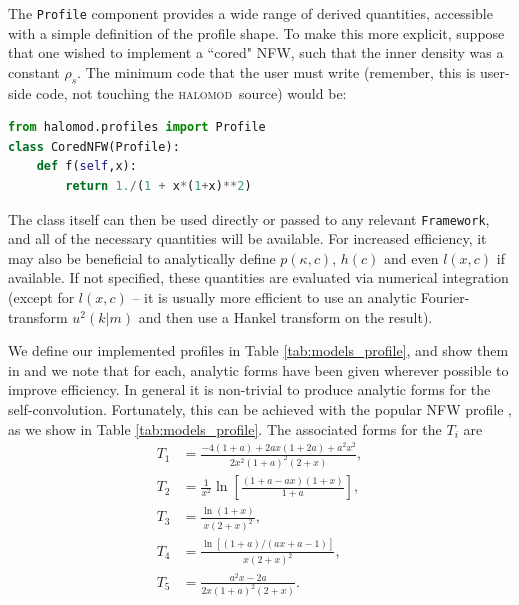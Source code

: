 \documentclass[5p,aas_macros]{elsarticle}
\newcommand{\halomod}{\textsc{halomod}\xspace} %
\newcommand{\framework}{\texttt{Framework}\xspace} %
\begin{document}
The \verb|Profile| component provides a wide range of derived quantities, accessible with a simple definition of the profile shape. To make this more explicit, suppose that one wished to implement a ``cored" NFW, such that the inner density was a constant $\rho_s$. The minimum code that the user must write (remember, this is user-side code, not touching the \halomod\ source) would be:
\begin{lstlisting}[language=Python]
from halomod.profiles import Profile
class CoredNFW(Profile):
	def f(self,x):
		return 1./(1 + x*(1+x)**2)
\end{lstlisting}
The class itself can then be used directly or passed to any relevant \framework, and all of the necessary quantities will be available. For increased efficiency, it may also be beneficial to analytically define $p(\kappa,c)$, $h(c)$ and even $l(x,c)$ if available. If not specified, these quantities are evaluated via numerical integration (except for $l(x,c)$ -- it is usually more efficient to use an analytic Fourier-transform $u^2(k|m)$ and then use a Hankel transform on the result).

We define our implemented profiles in Table \ref{tab:models_profile}, and show them in and we note that for each, analytic forms have been given wherever possible to improve efficiency. In general it is non-trivial to produce analytic forms for the self-convolution. Fortunately, this can be achieved with the popular NFW profile \citep{Sheth2001a}, as we show in Table \ref{tab:models_profile}. The associated forms for the $T_i$ are
\begin{subequations}
    \label{eq:nfw_t}
    \begin{align}
        T_1 &= \frac{-4(1+a)+2ax(1+2a)+a^2x^2}{2x^2(1+a)^2(2+x)},\\
        T_2 &= \frac{1}{x^2}\ln\left[\frac{(1+a-ax)(1+x)}{1+a}\right], \\
        T_3 &= \frac{\ln(1+x)}{x(2+x)^2}, \\
        T_4 &= \frac{\ln[(1+a)/(ax+a-1)]}{x(2+x)^2}, \\
        T_5 &= \frac{a^2x-2a}{2x(1+a)^2(2+x)}.
    \end{align}
\end{subequations}
\end{document}
